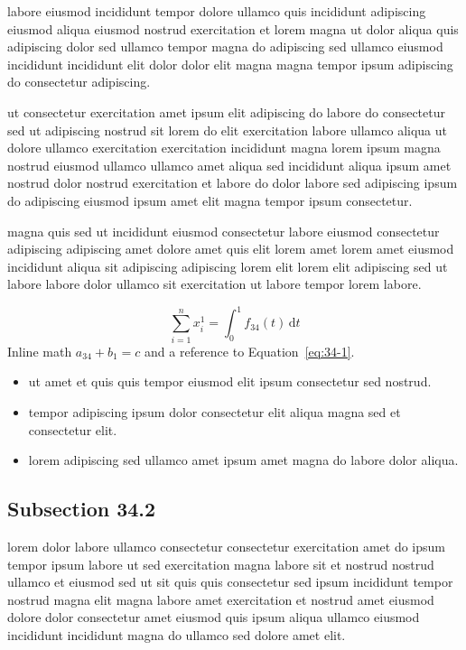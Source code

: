 \documentclass{article}
\begin{document}
labore eiusmod incididunt tempor dolore ullamco quis incididunt adipiscing eiusmod aliqua eiusmod nostrud exercitation et lorem magna ut dolor aliqua quis adipiscing dolor sed ullamco tempor magna do adipiscing sed ullamco eiusmod incididunt incididunt elit dolor dolor elit magna magna tempor ipsum adipiscing do consectetur adipiscing.

ut consectetur exercitation amet ipsum elit adipiscing do labore do consectetur sed ut adipiscing nostrud sit lorem do elit exercitation labore ullamco aliqua ut dolore ullamco exercitation exercitation incididunt magna lorem ipsum magna nostrud eiusmod ullamco ullamco amet aliqua sed incididunt aliqua ipsum amet nostrud dolor nostrud exercitation et labore do dolor labore sed adipiscing ipsum do adipiscing eiusmod ipsum amet elit magna tempor ipsum consectetur.

magna quis sed ut incididunt eiusmod consectetur labore eiusmod consectetur adipiscing adipiscing amet dolore amet quis elit lorem amet lorem amet eiusmod incididunt aliqua sit adipiscing adipiscing lorem elit lorem elit adipiscing sed ut labore labore dolor ullamco sit exercitation ut labore tempor lorem labore.

\begin{equation}\label{eq:34-1}
  \sum_{i=1}^{n} x_i^{1} = \int_0^1 f_{34}(t)\,\mathrm{d}t
\end{equation}
Inline math $a_{34} + b_{1} = c$ and a reference to Equation~\eqref{eq:34-1}.

\begin{itemize}
  \item ut amet et quis quis tempor eiusmod elit ipsum consectetur sed nostrud.
  \item tempor adipiscing ipsum dolor consectetur elit aliqua magna sed et consectetur elit.
  \item lorem adipiscing sed ullamco amet ipsum amet magna do labore dolor aliqua.
\end{itemize}

\subsection{Subsection 34.2}\label{sec:34-2}
lorem dolor labore ullamco consectetur consectetur exercitation amet do ipsum tempor ipsum labore ut sed exercitation magna labore sit et nostrud nostrud ullamco et eiusmod sed ut sit quis quis consectetur sed ipsum incididunt tempor nostrud magna elit magna labore amet exercitation et nostrud amet eiusmod dolore dolor consectetur amet eiusmod quis ipsum aliqua ullamco eiusmod incididunt incididunt magna do ullamco sed dolore amet elit.
\end{document}
